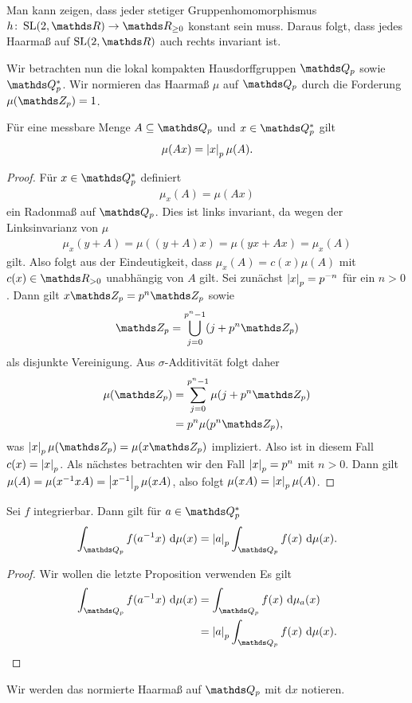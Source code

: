 \begin{bsp}
Man kann zeigen, dass jeder stetiger Gruppenhomomorphismus $h \colon \SL(2,\R)\to \R_{\geq 0}$ konstant sein muss.
Daraus folgt, dass jedes Haarmaß auf $\SL(2,\R)$ auch rechts invariant ist.
\end{bsp}

Wir betrachten nun die lokal kompakten Hausdorffgruppen $\Q_p$ sowie $\Q_p^\ast$.
Wir normieren das Haarmaß $\mu$ auf $\Q_p$ durch die Forderung $\mu(\Z_p)=1$.

\begin{prop}
Für eine messbare Menge $A \subseteq \Q_p$ und $x \in \Q_p^\ast$ gilt
\begin{align*}
\mu(Ax)=\left\vert x\right\vert_p\mu(A).
\end{align*}
\end{prop}

\begin{proof}
Für $x \in \Q_p^\ast$ definiert
\begin{align*}
\mu_x(A)=\mu(Ax)
\end{align*}
ein Radonmaß auf $\Q_p$.
Dies ist links invariant, da wegen der Linksinvarianz von $\mu$
\begin{align*}
\mu_x(y+A)=\mu((y+A)x)=\mu(yx+Ax)=\mu_x(A)
\end{align*}
gilt.
Also folgt aus der Eindeutigkeit, dass $\mu_x(A)=c(x)\mu(A)$ mit $c(x)\in \R_{> 0}$ unabhängig von $A$ gilt.
Sei zunächst $\left\vert x\right\vert_p=p^{-n}$ für ein $n>0$.
Dann gilt $x\Z_p=p^n\Z_p$ sowie 
\begin{align*}
\Z_p=\bigcup_{j=0}^{p^n-1}(j+p^n\Z_p)
\end{align*}
als disjunkte Vereinigung.
Aus $\sigma$-Additivität folgt daher
\begin{align*}
\mu(\Z_p)&=\sum_{j=0}^{p^n-1} \mu(j+p^n\Z_p)\\
&=p^n \mu(p^n \Z_p),
\end{align*}
was $\abs{x}_p\mu(\Z_p)=\mu(x\Z_p)$ impliziert.
Also ist in diesem Fall $c(x)=\left\vert x\right\vert_p$.
Als nächstes betrachten wir den Fall $\left\vert x\right\vert_p=p^n$ mit $n>0$.
Dann gilt
$\mu(A)=\mu(x^{-1}xA)=\left\vert x^{-1}\right\vert_p\mu(xA)$,
also folgt $\mu(xA)=\left\vert x\right\vert_p\mu(A)$.
\end{proof}

\begin{cor}
Sei $f$ integrierbar. Dann gilt für $a \in \Q_p^\ast$
\begin{align*}
\int_{\Q_p}f(a^{-1}x)~\mathrm{d}\mu(x)=\abs{a}_p\int_{\Q_p}f(x)~\mathrm{d}\mu(x).
\end{align*}
\end{cor}
\begin{proof}
Wir wollen die letzte Proposition verwenden
Es gilt 
\begin{align*}
\int_{\Q_p}f(a^{-1}x)~\mathrm{d}\mu(x)&=\int_{\Q_p} f(x)~\mathrm{d}\mu_a(x)\\
&=\abs{a}_p \int_{\Q_p} f(x)~\mathrm{d}\mu(x).
\end{align*}
\qedhere
\end{proof}
Wir werden das normierte Haarmaß auf $\Q_p$ mit $\mathrm{d}x$ notieren.


